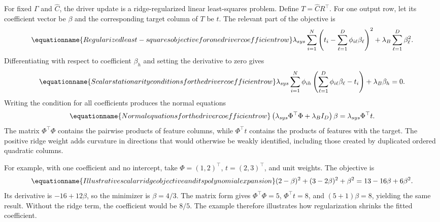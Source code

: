 For fixed \(\Gamma\) and \(\widehat C\), the driver update is a ridge-regularized linear least-squares problem. Define \(T=\widehat C R^\top\). For one output row, let its coefficient vector be \(\beta\) and the corresponding target column of \(T\) be \(t\). The relevant part of the objective is
\begin{equation}
\equationname{Regularized least-squares objective for one driver coefficient row}
\label{eq:icsor_ridge_row_objective}
\lambda_{sys}\sum_{i=1}^{N}
\left(t_i-\sum_{\ell=1}^{D}\phi_{i\ell}\beta_\ell\right)^2
+\lambda_B\sum_{\ell=1}^{D}\beta_\ell^2.
\end{equation}
Differentiating with respect to coefficient \(\beta_h\) and setting the derivative to zero gives
\begin{equation}
\equationname{Scalar stationarity conditions for the driver coefficient row}
\label{eq:icsor_ridge_scalar_normal}
\lambda_{sys}\sum_{i=1}^{N}\phi_{ih}
\left(\sum_{\ell=1}^{D}\phi_{i\ell}\beta_\ell-t_i\right)
+\lambda_B\beta_h=0.
\end{equation}
Writing the condition for all coefficients produces the normal equations
\begin{equation}
\equationname{Normal equations for the driver coefficient row}
\label{eq:icsor_ridge_normal_equations}
\left(\lambda_{sys}\Phi^\top\Phi+\lambda_BI_D\right)\beta
=\lambda_{sys}\Phi^\top t.
\end{equation}
The matrix \(\Phi^\top\Phi\) contains the pairwise products of feature columns, while \(\Phi^\top t\) contains the products of features with the target. The positive ridge weight adds curvature in directions that would otherwise be weakly identified, including those created by duplicated ordered quadratic columns.

For example, with one coefficient and no intercept, take \(\Phi=(1,2)^\top\), \(t=(2,3)^\top\), and unit weights. The objective is
\begin{equation}
\equationname{Illustrative scalar ridge objective and its polynomial expansion}
\label{eq:icsor_ridge_numeric_example}
(2-\beta)^2+(3-2\beta)^2+\beta^2
=13-16\beta+6\beta^2.
\end{equation}
Its derivative is \(-16+12\beta\), so the minimizer is \(\beta=4/3\). The matrix form gives \(\Phi^\top\Phi=5\), \(\Phi^\top t=8\), and \((5+1)\beta=8\), yielding the same result. Without the ridge term, the coefficient would be \(8/5\). The example therefore illustrates how regularization shrinks the fitted coefficient.

